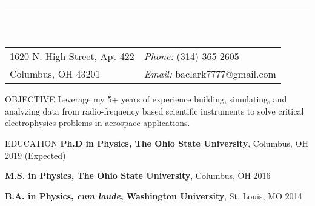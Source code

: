 \documentclass{resume} %
\begin{document}

\vspace{-1cm}
\rule{\textwidth}{0.1cm} \\ \\
\begin{tabular}{@{}p{2in}p{4in}}
1620 N. High Street, Apt 422             & {\it Phone:}  (314) 365-2605 \\            
Columbus, OH 43201  & {\it Email:}  baclark7777@gmail.com \\   
\end{tabular}


\begin{rSection}{OBJECTIVE}
Leverage my 5+ years of experience building, simulating, and analyzing data from radio-frequency based scientific instruments to solve critical electrophysics problems in aerospace applications.
\end{rSection}



\begin{rSection}{EDUCATION}
\textbf{Ph.D in Physics, The Ohio State University}, Columbus, OH \hfill 2019 (Expected)\\
\vspace*{-.2in}

\textbf{M.S. in Physics, The Ohio State University}, Columbus, OH \hfill 2016 \\
\vspace*{-.2in}

\textbf{B.A. in Physics, \textit{cum laude}, Washington University}, St. Louis, MO \hfill 2014\\
\vspace*{-.2in}
\end{rSection}
\end{document}
